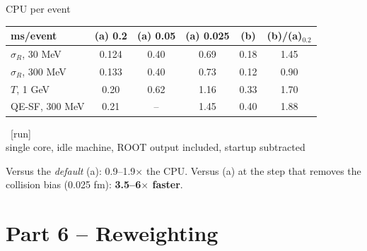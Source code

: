\documentclass[10pt,aspectratio=169]{beamer}
\newcommand{\tagrun}{{\scriptsize\color{okGreen}[run]}}
\begin{document}
\begin{frame}{CPU per event}
\centering
\small
\begin{tabular}{lccccc}
\toprule
ms/event & (a) 0.2 & (a) 0.05 & (a) 0.025 & (b) & (b)/(a)$_{0.2}$\\
\midrule
$\sigma_R$, 30 MeV & 0.124 & 0.40 & 0.69 & 0.18 & 1.45\\
$\sigma_R$, 300 MeV & 0.133 & 0.40 & 0.73 & 0.12 & 0.90\\
$T$, 1 GeV & 0.20 & 0.62 & 1.16 & 0.33 & 1.70\\
QE-SF, 300 MeV & 0.21 & -- & 1.45 & 0.40 & 1.88\\
\bottomrule
\end{tabular}\ \tagrun\\[4pt]
{\scriptsize single core, idle machine, ROOT output included, startup subtracted}\\[8pt]
\begin{keybox}
Versus the \emph{default} (a): 0.9--1.9$\times$ the CPU. \quad Versus (a) at the step that removes the collision bias (0.025 fm): \textbf{3.5--6$\times$ faster}.
\end{keybox}
\end{frame}

\section{Part 6 -- Reweighting}
\end{document}
